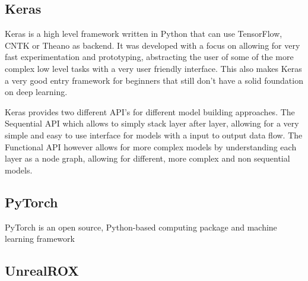
\subsection{Keras}
Keras is a high level framework written in Python that can use TensorFlow, CNTK or Theano as backend. It was developed with a focus on allowing for very fast experimentation and prototyping, abstracting the user of some of the more complex low level tasks with a very user friendly interface. This also makes Keras a very good entry framework for beginners that still don't have a solid foundation on deep learning.

Keras provides two different API's for different model building approaches. The Sequential API which allows to simply stack layer after layer, allowing for a very simple and easy to use interface for models with a input to output data flow. The Functional API however allows for more complex models by understanding each layer as a node graph, allowing for different, more complex and non sequential models.
 
\subsection{PyTorch}
PyTorch is an open source, Python-based computing package and machine learning framework

\subsection{UnrealROX}
 